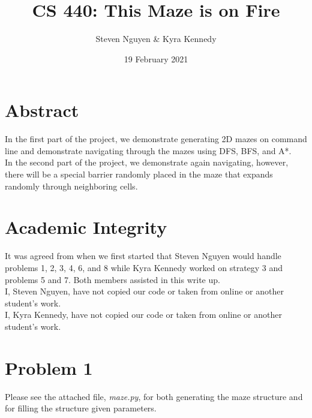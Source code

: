 \documentclass[12pt]{report}
\title{CS 440: This Maze is on Fire}
\author{Steven Nguyen \& Kyra Kennedy}
\date{19 February 2021}
\begin{document}
\begin{titlepage}
\maketitle
\end{titlepage}

\section{Abstract}
In the first part of the project, we demonstrate generating 2D mazes on command line and demonstrate navigating through the mazes using DFS, BFS, and A*.\\
In the second part of the project, we demonstrate again navigating, however, there will be a special barrier randomly placed in the maze that expands randomly through neighboring cells.

\section{Academic Integrity}
It was agreed from when we first started that Steven Nguyen would handle problems 1, 2, 3, 4, 6, and 8 while Kyra Kennedy worked on strategy 3 and problems 5 and 7. Both members assisted in this write up.\\
I, Steven Nguyen, have not copied our code or taken from online or another student's work.\\
I, Kyra Kennedy, have not copied our code or taken from online or another student's work.

\section{Problem 1}
Please see the attached file, \emph{maze.py}, for both generating the maze structure and for filling the structure given parameters.

\break
\end{document}
